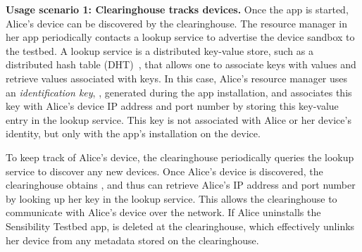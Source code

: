 {{\textbf{Usage scenario 1: Clearinghouse tracks devices.}
Once the app is started, Alice's device can be discovered by 
the clearinghouse. The resource manager in her app periodically contacts 
a lookup service to advertise the device sandbox to the testbed. 
A lookup service is a distributed key-value store, such as a 
distributed hash table (DHT)~\cite{dht}, that allows one to associate 
keys with values and retrieve values associated with keys. In this case, 
Alice's resource manager uses an \textit{identification key}, , 
generated during the app installation, and associates this key 
with Alice's device IP address and port number by 
storing this key-value entry in the lookup service. This key is not 
associated with Alice or her device's identity, but only with the app's 
installation on the device. 



To keep track of Alice's device, the
clearinghouse periodically queries the lookup service to
discover any new devices. Once Alice's device is discovered, the
clearinghouse obtains , and thus
can retrieve Alice's  IP address and port number by 
looking up her key in the lookup service. This allows the clearinghouse
to communicate with Alice's device over the network.
If Alice uninstalls the Sensibility Testbed app, 
 is deleted at the clearinghouse, which effectively unlinks
her device from any metadata stored on the clearinghouse.


}}

